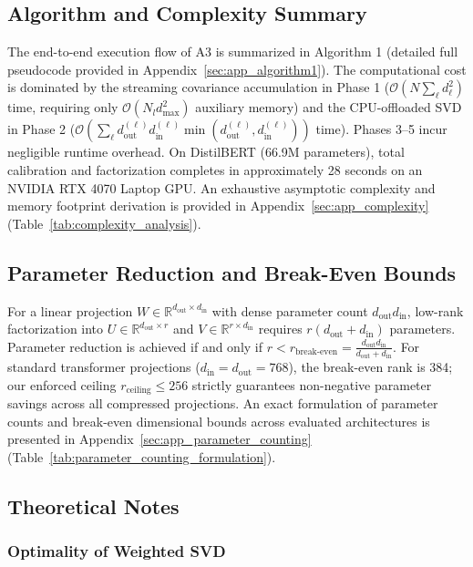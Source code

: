 \subsection{Algorithm and Complexity Summary}

The end-to-end execution flow of A3 is summarized in Algorithm 1 (detailed full pseudocode provided in Appendix~\ref{sec:app_algorithm1}). The computational cost is dominated by the streaming covariance accumulation in Phase 1 ($\mathcal{O}(N \sum_\ell d_\ell^2)$ time, requiring only $\mathcal{O}(N_l d_\text{max}^2)$ auxiliary memory) and the CPU-offloaded SVD in Phase 2 ($\mathcal{O}(\sum_\ell d_\text{out}^{(\ell)} d_\text{in}^{(\ell)} \min(d_\text{out}^{(\ell)}, d_\text{in}^{(\ell)}))$ time). Phases 3--5 incur negligible runtime overhead. On DistilBERT (66.9M parameters), total calibration and factorization completes in approximately 28 seconds on an NVIDIA RTX 4070 Laptop GPU. An exhaustive asymptotic complexity and memory footprint derivation is provided in Appendix~\ref{sec:app_complexity} (Table~\ref{tab:complexity_analysis}).

\subsection{Parameter Reduction and Break-Even Bounds}

For a linear projection $W \in \mathbb{R}^{d_\text{out} \times d_\text{in}}$ with dense parameter count $d_\text{out} d_\text{in}$, low-rank factorization into $U \in \mathbb{R}^{d_\text{out} \times r}$ and $V \in \mathbb{R}^{r \times d_\text{in}}$ requires $r(d_\text{out} + d_\text{in})$ parameters. Parameter reduction is achieved if and only if $r < r_\text{break-even} = \frac{d_\text{out} d_\text{in}}{d_\text{out} + d_\text{in}}$. For standard transformer projections ($d_\text{in} = d_\text{out} = 768$), the break-even rank is 384; our enforced ceiling $r_{\mathrm{ceiling}} \le 256$ strictly guarantees non-negative parameter savings across all compressed projections. An exact formulation of parameter counts and break-even dimensional bounds across evaluated architectures is presented in Appendix~\ref{sec:app_parameter_counting} (Table~\ref{tab:parameter_counting_formulation}).

\subsection{Theoretical Notes}

\subsubsection{Optimality of Weighted SVD}

